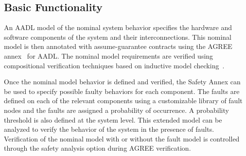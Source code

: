 \subsection{Basic Functionality}

An AADL model of the nominal system behavior specifies the hardware and software components of the system and their interconnections. This nominal model is then annotated with assume-guarantee contracts using the AGREE annex~\cite{NFM2012:CoGaMiWhLaLu} for AADL. The nominal model requirements are verified using compositional verification techniques based on inductive model checking~\cite{2017arXiv171201222G}.

Once the nominal model behavior is defined and verified, the Safety Annex can be used to specify possible faulty behaviors for each component. The faults are defined on each of the relevant components using a customizable library of fault nodes and the faults are assigned a probability of occurrence. A probability threshold is also defined at the system level. This extended model can be analyzed to verify the behavior of the system in the presence of faults. Verification of the nominal model with or without the fault model is controlled through the safety analysis option during AGREE verification.

